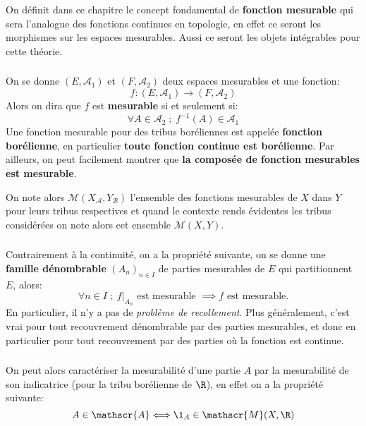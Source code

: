 \chapter*{} %
On définit dans ce chapitre le concept fondamental de \textbf{fonction mesurable} qui sera l'analogue des fonctions continues en topologie, en effet ce seront les morphismes sur les espaces mesurables. Aussi ce seront les objets intégrables pour cette théorie.

\subsection*{}
On se donne \((E, \mathscr{A}_1)\) et \((F, \mathscr{A}_2)\) deux espaces mesurables et une fonction:
\[
   f : (E, \mathscr{A}_1) \longrightarrow (F, \mathscr{A}_2)
\]
Alors on dira que \(f\) est \textbf{mesurable} si et seulement si:
\[
   \forall A \in \mathscr{A}_2 \; ; \; f^{-1}(A) \in \mathscr{A}_1
\]
Une fonction mesurable pour des tribus boréliennes est appelée \textbf{fonction borélienne}, en particulier \textbf{toute fonction continue est borélienne}. Par ailleurs, on peut facilement montrer que \textbf{la composée de fonction mesurables est mesurable}.\<

On note alors \(\mathscr{M}(X_{\mathscr{A}}, Y_{\mathscr{B}})\) l'ensemble des fonctions mesurables de \(X\) dans \(Y\) pour leurs tribus respectives et quand le contexte rends évidentes les tribus considérées on note alors cet ensemble \(\mathscr{M}(X, Y)\).
\subsection*{}
Contrairement à la continuité, on a la propriété suivante, on se donne une \textbf{famille dénombrable} \((A_n)_{n \in I}\) de parties mesurables de \(E\) qui partitionnent \(E\), alors:
\[
   \forall n \in I \; ; \; f \big|_{A_n} \text{ est mesurable } \implies f \text{ est mesurable.}
\] 
En particulier, il n'y a pas de \textit{problème de recollement}. Plus généralement, c'est vrai pour tout recouvrement dénombrable par des parties mesurables, et donc en particulier pour tout recouvrement par des parties où la fonction est continue.

\subsection*{}
On peut alors caractériser la mesurabilité d'une partie \(A\) par la mesurabilité de son indicatrice (pour la tribu borélienne de \(\R\)), en effet on a la propriété suivante:
\[
   A \in \mathscr{A} \Longleftrightarrow \1_A \in \mathscr{M}(X, \R)
\]

